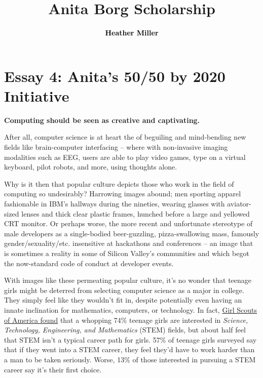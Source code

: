 \documentclass[acmtocl]{acmtrans2m}
\title{{\color{Black}Anita Borg Scholarship}}
\author{\textcolor{Black}{\textbf{Heather Miller}}}
\begin{document}
\setmonofont[Mapping=tex-text,Scale=0.9]{Inconsolata}
%
\maketitle
\section*{\textbf{ Essay 4:} Anita's 50/50 by 2020 Initiative}

{\bf Computing should be seen as creative and captivating.}

After all, computer science is at heart the of beguiling and mind-bending new
fields like {brain-computer} interfacing -- where with non-invasive imaging
modalities such as EEG, users are able to play video games, type on a virtual
keyboard, pilot robots, and more, using thoughts alone.

Why is it then that popular culture depicts those who work in the field of
computing so undesirably? Harrowing images abound; men sporting apparel
fashionable in IBM's hallways during the nineties, wearing glasses with
aviator-sized lenses and thick clear plastic frames, hunched before a large
and yellowed CRT monitor. Or perhaps worse, the more recent and unfortunate
stereotype of male developers as a {single-bodied} {beer-guzzling},
{pizza-swallowing} mass, famously gender/sexuality/etc. insensitive at
hackathons and conferences -- an image that is sometimes a reality in
some of Silicon Valley's communities and which begot the {now-standard} code
of conduct at developer events.

With images like these permeating popular culture, it's no wonder that teenage
girls might be deterred from selecting computer science as a major in college.
They simply feel like they wouldn't fit in, despite potentially even having an
innate inclination for mathematics, computers, or technology. In fact,
\href{https://www.girlscouts.org/research/pdf/generation\_stem\_full\_report.pdf}{Girl Scouts of America found}
\cite{Girlscouts} that a whopping 74\% teenage girls
are interested in {\em Science, Technology, Engineering, and Mathematics}
(STEM) fields, but about half feel that STEM isn't a typical career path for
girls. 57\% of teenage girls surveyed say that if they went into a STEM career,
they feel they'd have to work harder than a man to be taken seriously. Worse,
13\% of those interested in pursuing a STEM career say it's their first
choice.
\end{document}
